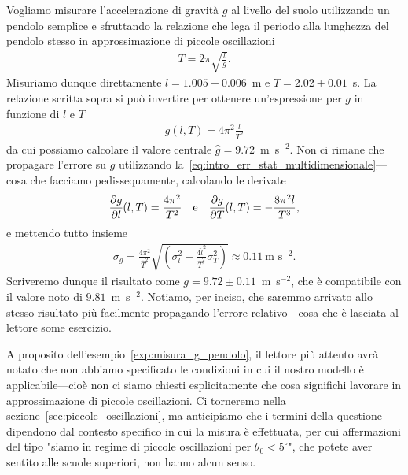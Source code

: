 \begin{examplebox}

  \begin{example}\label{exp:misura_g_pendolo}
    Vogliamo misurare l'accelerazione di gravità $g$ al livello del suolo
    utilizzando un pendolo semplice e sfruttando la relazione che lega il
    periodo alla lunghezza del pendolo stesso in approssimazione di piccole
    oscillazioni
    \begin{align}\label{eq:periodo_pendolo}
      T = 2\pi\sqrt{\frac{l}{g}}.
    \end{align}
    Misuriamo dunque direttamente $l = 1.005 \pm 0.006$~m e
    $T = 2.02 \pm 0.01$~s. La relazione scritta sopra si può invertire per
    ottenere un'espressione per $g$ in funzione di $l$ e $T$
    \begin{align*}
      g(l, T) = 4\pi^2\frac{l}{T^2}
    \end{align*}
    da cui possiamo calcolare il valore centrale $\hat{g} = 9.72$~m~s$^{-2}$.
    Non ci rimane che propagare l'errore su $g$ utilizzando
    la~\eqref{eq:intro_err_stat_multidimensionale}---cosa che
    facciamo pedissequamente, calcolando le derivate
    \begin{align*}
      \pd{g}{l}{l, T} = \frac{4\pi^2}{T^2} \quad\text{e}\quad
      \pd{g}{T}{l, T} = -\frac{8\pi^2l}{T^3},
    \end{align*}
    e mettendo tutto insieme
    \begin{align*}
      \sigma_g = \frac{4\pi^2}{\hat{T}^2}\sqrt{
        \left(\sigma_l^2 + \frac{4\hat{l}^2}{\hat{T}^2}\sigma_T^2\right)
      } \approx 0.11~\text{m~s}^{-2}.
    \end{align*}
    Scriveremo dunque il risultato come $g = 9.72 \pm 0.11$~m~s$^{-2}$, che
    è compatibile con il valore noto di $9.81$~m~s$^{-2}$.
    Notiamo, per inciso, che saremmo arrivato allo stesso risultato più
    facilmente propagando l'errore relativo---cosa che è lasciata al lettore
    some esercizio.
  \end{example}
\end{examplebox}

A proposito dell'esempio~\ref{exp:misura_g_pendolo}, il lettore più attento
avrà notato che non abbiamo specificato le condizioni in cui il nostro modello
è applicabile---cioè non ci siamo chiesti esplicitamente che cosa
significhi lavorare in approssimazione di piccole oscillazioni. Ci torneremo
nella sezione~\ref{sec:piccole_oscillazioni}, ma anticipiamo che i termini
della questione dipendono dal contesto specifico in cui la misura è
effettuata, per cui affermazioni del tipo "siamo in regime di piccole
oscillazioni per $\theta_0 < 5^\circ$", che potete aver sentito alle scuole
superiori, non hanno alcun senso.



